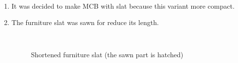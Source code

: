 \begin{enumerate}
\begin{enumerate}
\begin{enumerate}
      \end{enumerate}
      \item It was decided to make MCB with slat because this variant more compact.
      
      \item The furniture slat was sawn for reduce its length.
      
      \begin{figure}[H]
      	\begin{minipage}[h]{0.2\linewidth}
      		\center   
      	\end{minipage}
      	\begin{minipage}[h]{0.6\linewidth}
      		\caption{Shortened furniture slat \newline (the sawn part is hatched)}
      	\end{minipage}
      \end{figure}
      

\end{enumerate}
\end{enumerate}
